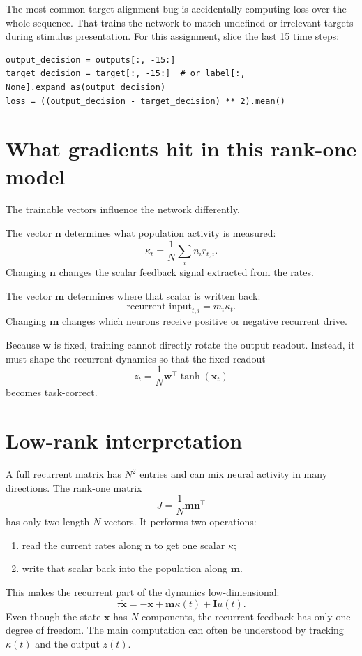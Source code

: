 \documentclass[11pt]{article}
\newcommand{\vx}{\mathbf{x}}
\newcommand{\vm}{\mathbf{m}}
\newcommand{\vn}{\mathbf{n}}
\newcommand{\vI}{\mathbf{I}}
\newcommand{\vw}{\mathbf{w}}
\begin{document}
The most common target-alignment bug is accidentally computing loss over the
whole sequence. That trains the network to match undefined or irrelevant targets
during stimulus presentation. For this assignment, slice the last 15 time steps:
\begin{lstlisting}[style=python]
output_decision = outputs[:, -15:]
target_decision = target[:, -15:]  # or label[:, None].expand_as(output_decision)
loss = ((output_decision - target_decision) ** 2).mean()
\end{lstlisting}

\section{What gradients hit in this rank-one model}

The trainable vectors influence the network differently.

The vector $\vn$ determines what population activity is measured:
\[
  \kappa_t = \frac{1}{N}\sum_i n_i r_{t,i}.
\]
Changing $\vn$ changes the scalar feedback signal extracted from the rates.

The vector $\vm$ determines where that scalar is written back:
\[
  \text{recurrent input}_{t,i} = m_i\kappa_t.
\]
Changing $\vm$ changes which neurons receive positive or negative recurrent
drive.

Because $\vw$ is fixed, training cannot directly rotate the output readout.
Instead, it must shape the recurrent dynamics so that the fixed readout
\[
  z_t = \frac{1}{N}\vw^\top \tanh(\vx_t)
\]
becomes task-correct.

\section{Low-rank interpretation}

A full recurrent matrix has $N^2$ entries and can mix neural activity in many
directions. The rank-one matrix
\[
  J = \frac{1}{N}\vm\vn^\top
\]
has only two length-$N$ vectors. It performs two operations:
\begin{enumerate}
  \item read the current rates along $\vn$ to get one scalar $\kappa$;
  \item write that scalar back into the population along $\vm$.
\end{enumerate}
This makes the recurrent part of the dynamics low-dimensional:
\[
  \tau\dot{\vx} = -\vx + \vm\kappa(t) + \vI u(t).
\]
Even though the state $\vx$ has $N$ components, the recurrent feedback has only
one degree of freedom. The main computation can often be understood by tracking
$\kappa(t)$ and the output $z(t)$.
\end{document}
